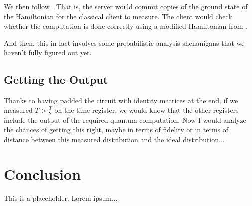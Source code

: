 \documentclass{article}
\theoremstyle{definition}
\begin{document}
We then follow \cite{1804.01082}. That is, the server would commit copies of the ground state of the Hamiltonian for the classical client to measure. The client would check whether the computation is done correctly using a modified Hamiltonian from \cite{quant-ph/0406180}. 

And then, this in fact involves some probabilistic analysis shenanigans that we haven't fully figured out yet.

\subsection{Getting the Output}

Thanks to having padded the circuit with identity matrices at the end, if we measured $T>\frac{T}{2}$ on the time register, we would know that the other registers include the output of the required quantum computation. Now I would analyze the chances of getting this right, maybe in terms of fidelity or in terms of distance between this measured distribution and the ideal distribution...

\section{Conclusion}

This is a placeholder. Lorem ipsum...



\end{document}
